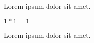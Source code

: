 \documentclass{article}
\begin{document}
Lorem ipsum dolor sit amet.

$1 * 1 = 1$

Lorem ipsum dolor sit amet.
\end{document}
